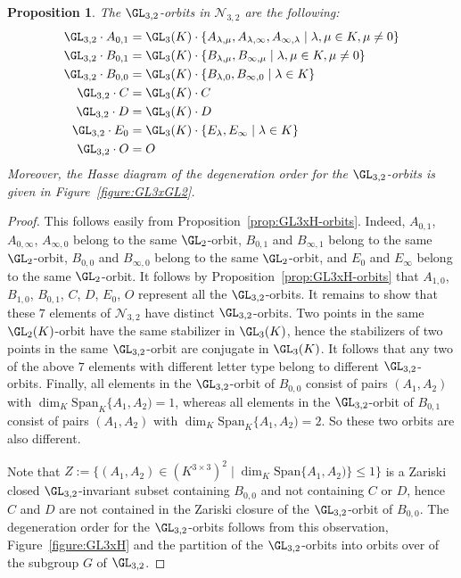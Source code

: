 \documentclass[12pt]{amsart}
\newtheorem{proposition}[theorem]{\bf Proposition}
\newcommand{\field}{K}
\begin{document}
\begin{proposition}\label{prop:GL3xGL2}
The $\GL_{3,2}$-orbits in $\mathcal{N}_{3,2}$ are the following: 
\begin{align*}
    \GL_{3,2}\cdot A_{0,1}&=
    \GL_3(\field)\cdot\{A_{\lambda,\mu},A_{\lambda,\infty},A_{\infty,\lambda}\mid
    \lambda,\mu\in\field,\mu\neq 0\}\\
    \GL_{3,2}\cdot B_{0,1}&=
    \GL_3(\field)\cdot\{B_{\lambda,\mu},B_{\infty,\mu}\mid 
    \lambda,\mu\in\field,\mu\neq 0\}\\
    \GL_{3,2}\cdot B_{0,0}&=
     \GL_3(\field)\cdot\{B_{\lambda,0},B_{\infty,0}\mid \lambda\in\field\}\\
     \GL_{3,2}\cdot C&=\GL_3(\field)\cdot C \\
    \GL_{3,2}\cdot D&=\GL_3(\field)\cdot D \\
    \GL_{3,2}\cdot E_0&=\GL_3(\field)\cdot
    \{E_\lambda,E_\infty\mid \lambda\in \field\}\\
    \GL_{3,2}\cdot O&= O
\end{align*}
Moreover, the Hasse diagram of the degeneration order for the 
$\GL_{3,2}$-orbits is given in Figure~\ref{figure:GL3xGL2}. 
    \end{proposition}

\begin{proof} 
This follows easily from Proposition~\ref{prop:GL3xH-orbits}. 
Indeed, $A_{0,1}$, $A_{0,\infty}$, $A_{\infty,0}$ belong to the same $\GL_2$-orbit, 
$B_{0,1}$ and $B_{\infty,1}$ belong to the same $\GL_2$-orbit, 
$B_{0,0}$ and $B_{\infty,0}$ belong to the same $\GL_2$-orbit, and 
$E_0$ and $E_\infty$ belong to the same $\GL_2$-orbit. 
It follows by Proposition~\ref{prop:GL3xH-orbits}  
that $A_{1,0}$, $B_{1,0}$, $B_{0,1}$, $C$, $D$, $E_0$, $O$ represent all the 
$\GL_{3,2}$-orbits. 
It remains to show that these $7$ elements of $\mathcal{N}_{3,2}$ have distinct 
$\GL_{3,2}$-orbits. 
Two points in the same $\GL_2(\field)$-orbit have the same stabilizer in $\GL_3(\field)$, 
hence the stabilizers of two points in the same $\GL_{3,2}$-orbit are conjugate in 
$\GL_3(\field)$. It follows that 
any two of the above $7$ elements with different letter type belong to different $\GL_{3,2}$-orbits. 
Finally, all elements in the $\GL_{3,2}$-orbit of $B_{0,0}$ consist of pairs 
$(A_1,A_2)$ with $\dim_\field\mathrm{Span}_\field\{A_1,A_2)=1$, 
whereas all elements in the $\GL_{3,2}$-orbit of $B_{0,1}$ consist of pairs 
$(A_1,A_2)$ with $\dim_\field\mathrm{Span}_\field\{A_1,A_2)=2$. So these two orbits are also different. 

Note that 
$Z:= \{(A_1,A_2)\in (\field^{3\times 3})^2\mid \dim_\field \mathrm{Span}\{A_1,A_2)\}\le 1\}$ 
is a Zariski closed $\GL_{3,2}$-invariant subset containing $B_{0,0}$ and not containing $C$ or $D$, hence 
$C$ and $D$ are not contained in the Zariski closure of the $\GL_{3,2}$-orbit of $B_{0,0}$. 
The degeneration order for the $\GL_{3,2}$-orbits follows from this observation, 
Figure~\ref{figure:GL3xH} and the partition of the 
$\GL_{3,2}$-orbits into orbits over of the subgroup $G$ of $\GL_{3,2}$. 
\end{proof}
\end{document}
